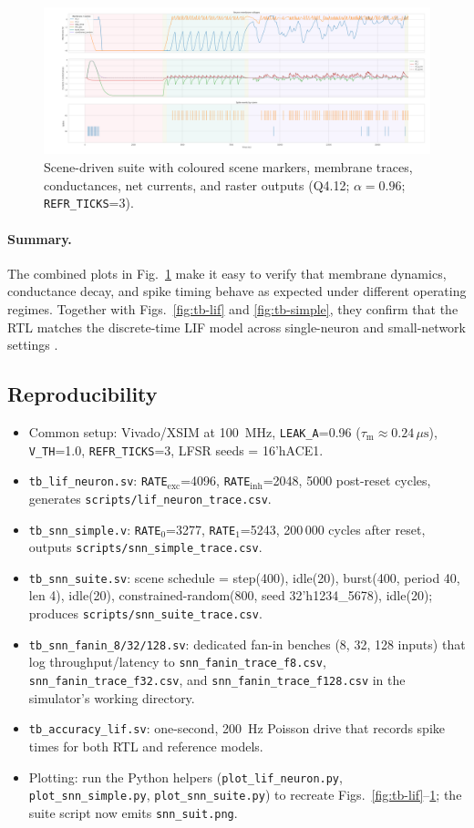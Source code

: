 \documentclass[10pt,onecolumn]{IEEEtran}
\newcommand{\taum}{\tau_{\mathrm{m}}}
\begin{document}
\begin{figure}[htbp!]
  \centering
  \includegraphics[width=0.585\linewidth]{snn_suit.png}
  \caption{Scene-driven suite with coloured scene markers, membrane traces, conductances, net currents, and raster outputs (Q4.12; \(\alpha=0.96\); \texttt{REFR\_TICKS}=3).}
  \label{fig:tb-suite}
\end{figure}

\paragraph{Summary.}
The combined plots in Fig.~\ref{fig:tb-suite} make it easy to verify that membrane dynamics, conductance decay, and spike timing behave as expected under different operating regimes. Together with Figs.~\ref{fig:tb-lif} and \ref{fig:tb-simple}, they confirm that the RTL matches the discrete-time LIF model across single-neuron and small-network settings \cite{GerstnerKistler2002,Maass1997}.

\subsection{Reproducibility}
\label{sec:repro}
\begin{itemize}
  \item Common setup: Vivado/XSIM at 100~MHz, \texttt{LEAK\_A}=0.96 (\(\taum\approx 0.24\,\mu\mathrm{s}\)), \texttt{V\_TH}=1.0, \texttt{REFR\_TICKS}=3, LFSR seeds = 16'hACE1.
  \item \texttt{tb\_lif\_neuron.sv}: \texttt{RATE}$_\text{exc}$=4096, \texttt{RATE}$_\text{inh}$=2048, 5000 post-reset cycles, generates \texttt{scripts/lif\_neuron\_trace.csv}.
  \item \texttt{tb\_snn\_simple.v}: \texttt{RATE}$_0$=3277, \texttt{RATE}$_1$=5243, 200\,000 cycles after reset, outputs \texttt{scripts/snn\_simple\_trace.csv}.
  \item \texttt{tb\_snn\_suite.sv}: scene schedule = step(400), idle(20), burst(400, period 40, len 4), idle(20), constrained-random(800, seed 32'h1234\_5678), idle(20); produces \texttt{scripts/snn\_suite\_trace.csv}.
  \item \texttt{tb\_snn\_fanin\_8/32/128.sv}: dedicated fan-in benches (8, 32, 128 inputs) that log throughput/latency to \texttt{snn\_fanin\_trace\_f8.csv}, \texttt{snn\_fanin\_trace\_f32.csv}, and \texttt{snn\_fanin\_trace\_f128.csv} in the simulator's working directory.
  \item \texttt{tb\_accuracy\_lif.sv}: one-second, 200~Hz Poisson drive that records spike times for both RTL and reference models.
  \item Plotting: run the Python helpers (\texttt{plot\_lif\_neuron.py}, \texttt{plot\_snn\_simple.py}, \texttt{plot\_snn\_suite.py}) to recreate Figs.~\ref{fig:tb-lif}–\ref{fig:tb-suite}; the suite script now emits \texttt{snn\_suit.png}.
\end{itemize}
\end{document}
